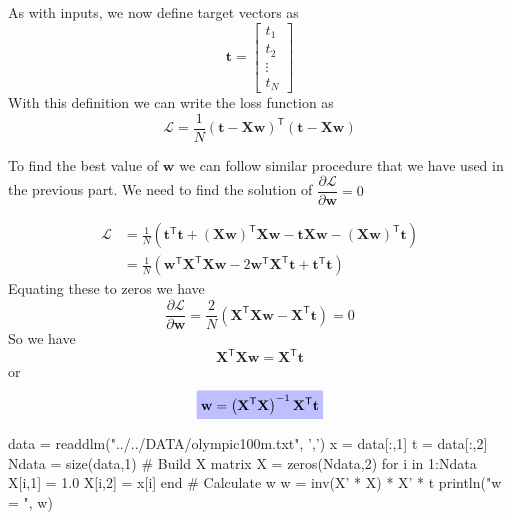 \documentclass[a4paper,11pt]{article} %
\newcommand{\highlighteq}[1]{\colorbox{blue!25}{$\displaystyle#1$}}
\begin{document}
As with inputs, we now define target vectors as
\begin{equation}
\mathbf{t} = \begin{bmatrix}
t_1 \\
t_2 \\
\vdots \\
t_N
\end{bmatrix}
\end{equation}
%
With this definition we can write the loss function as
\begin{equation}
\mathcal{L} = \frac{1}{N} \left( \mathbf{t} - \mathbf{Xw} \right)^{\mathsf{T}}
\left( \mathbf{t} - \mathbf{Xw} \right)
\end{equation}



To find the best value of $\mathbf{w}$ we can follow similar procedure that we have used
in the previous part. We need to find the solution of
$\dfrac{\partial \mathcal{L}}{\partial \mathbf{w}} = 0$

\begin{align}
\mathcal{L} & = \frac{1}{N} \left(
\mathbf{t}^{\mathsf{T}} \mathbf{t} +
\left(\mathbf{Xw}\right)^{\mathsf{T}} \mathbf{Xw} -
\mathbf{t}\mathbf{Xw} -
\left(\mathbf{Xw}\right)^{\mathsf{T}} \mathbf{t}
\right) \\
& = \frac{1}{N} \left(
\mathbf{w}^{\mathsf{T}} \mathbf{X}^{\mathsf{T}} \mathbf{X} \mathbf{w} -
2 \mathbf{w}^{\mathsf{T}} \mathbf{X}^{\mathsf{T}}\mathbf{t} +
\mathbf{t}^{\mathsf{T}} \mathbf{t}
\right)
\end{align}
Equating these to zeros we have
$$
\frac{\partial \mathcal{L}}{\partial \mathbf{w}} =
\frac{2}{N} \left( \mathbf{X}^{\mathsf{T}} \mathbf{Xw} - \mathbf{X}^{\mathsf{T}}\mathbf{t} \right) = 0
$$
So we have
\begin{equation}
\mathbf{X}^{\mathsf{T}} \mathbf{Xw} = \mathbf{X}^{\mathsf{T}} \mathbf{t}
\end{equation}
or
\begin{equation}
\highlighteq{
\mathbf{w} = \left(\mathbf{X}^{\mathsf{T}}\mathbf{X} \right)^{-1} \mathbf{X}^{\mathsf{T}} \mathbf{t}
}
\label{eq:w_vektor}
\end{equation}

\begin{juliacode}
data = readdlm("../../DATA/olympic100m.txt", ',')
x = data[:,1]
t = data[:,2]
Ndata = size(data,1)
# Build X matrix
X = zeros(Ndata,2)
for i in 1:Ndata
    X[i,1] = 1.0
    X[i,2] = x[i]
end
# Calculate w
w = inv(X' * X) * X' * t
println("w = ", w)
\end{juliacode}
\end{document}
